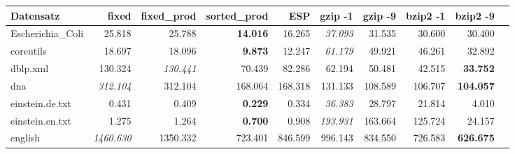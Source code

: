 \documentclass[10pt,a4paper]{standalone}
\begin{document}
\begin{tabular}{|l||r|r|r|r|r|r|r|r|r|}
	\hline
	Datensatz & fixed & fixed\_prod & sorted\_prod & ESP & gzip -1 & gzip -9 & bzip2 -1 & bzip2 -9 \\ \hline\hline
Escherichia\_Coli &          25.818 &         25.788 & \textbf{14.016} &  16.265 &  \emph{37.093} &  31.535 &  30.600 &           30.400 \\
      coreutils &          18.697 &         18.096 &  \textbf{9.873} &  12.247 &  \emph{61.179} &  49.921 &  46.261 &           32.892 \\
       dblp.xml &         130.324 & \emph{130.441} &          70.439 &  82.286 &         62.194 &  50.481 &  42.515 &  \textbf{33.752} \\
            dna &  \emph{312.104} &        312.104 &         168.064 & 168.318 &        131.133 & 108.589 & 106.707 & \textbf{104.057} \\
einstein.de.txt &           0.431 &          0.409 &  \textbf{0.229} &   0.334 &  \emph{36.383} &  28.797 &  21.814 &            4.010 \\
einstein.en.txt &           1.275 &          1.264 &  \textbf{0.700} &   0.908 & \emph{193.931} & 163.664 & 125.724 &           24.157 \\
        english & \emph{1460.630} &       1350.332 &         723.401 & 846.599 &        996.143 & 834.550 & 726.583 & \textbf{626.675} \\

\end{tabular}
\end{document}
